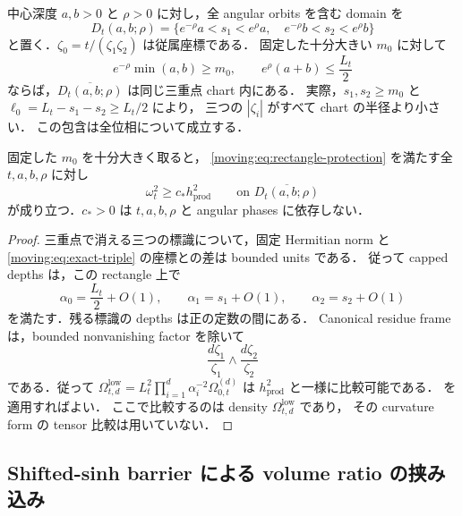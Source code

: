 中心深度 $a,b>0$ と $\rho>0$ に対し，全 angular orbits を含む domain を
\begin{equation}\label{moving:eq:rectangle}
 D_t(a,b;\rho)
 =\{e^{-\rho}a<s_1<e^\rho a,\quad
      e^{-\rho}b<s_2<e^\rho b\}
\end{equation}
と置く．$\zeta_0=t/(\zeta_1\zeta_2)$ は従属座標である．
固定した十分大きい $m_0$ に対して
\begin{equation}\label{moving:eq:rectangle-protection}
 e^{-\rho}\min(a,b)\ge m_0,
 \qquad e^\rho(a+b)\le \frac{L_t}{2}
\end{equation}
ならば，$\overline{D_t(a,b;\rho)}$ は同じ三重点 chart 内にある．
実際，$s_1,s_2\ge m_0$ と $\ell_0=L_t-s_1-s_2\ge L_t/2$ により，
三つの $|\zeta_i|$ がすべて chart の半径より小さい．
この包含は全位相について成立する．

\begin{lemma}
\label{moving:lem:coarse-volume-lower}
固定した $m_0$ を十分大きく取ると，
\eqref{moving:eq:rectangle-protection} を満たす全 $t,a,b,\rho$ に対し
\begin{equation}\label{moving:eq:coarse-volume-lower}
 \omega_t^2\ge c_* h_{\mathrm{prod}}^2
 \qquad\text{on }\overline{D_t(a,b;\rho)}
\end{equation}
が成り立つ．$c_*>0$ は $t,a,b,\rho$ と angular phases に依存しない．
\end{lemma}

\begin{proof}
三重点で消える三つの標識について，固定 Hermitian norm と
\eqref{moving:eq:exact-triple} の座標との差は bounded units である．
従って capped depths は，この rectangle 上で
\[
 \alpha_0=\frac{L_t}{2}+O(1),\qquad
 \alpha_1=s_1+O(1),\qquad
 \alpha_2=s_2+O(1)
\]
を満たす．残る標識の depths は正の定数の間にある．
Canonical residue frame は，bounded nonvanishing factor を除いて
\[
 \frac{d\zeta_1}{\zeta_1}\wedge\frac{d\zeta_2}{\zeta_2}
\]
である．従って $\Omega_{t,d}^{\mathrm{low}}=L_t^2\prod_{i=1}^d\alpha_i^{-2}\Omega_{0,t}^{(d)}$ は
$h_{\mathrm{prod}}^2$ と一様に比較可能である．
 を適用すればよい．
ここで比較するのは density $\Omega_{t,d}^{\mathrm{low}}$ であり，
その curvature form の tensor 比較は用いていない．
\end{proof}

\subsection{Shifted-sinh barrier による volume ratio の挟み込み}

